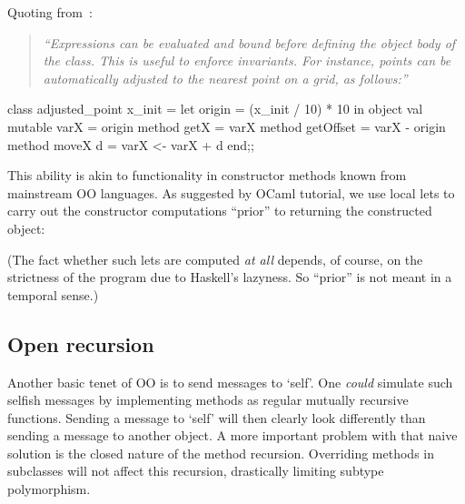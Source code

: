 Quoting from~\cite[\S\,3.1]{OCaml}:

\begin{quote}\itshape\small
``Expressions can be evaluated and bound before defining the object
body of the class. This is useful to enforce invariants. For instance,
points can be automatically adjusted to the nearest point on a grid,
as follows:''
\end{quote}

\begin{code}
 class adjusted_point x_init =
   let origin = (x_init / 10) * 10 in
   object
     val mutable varX = origin
     method getX      = varX
     method getOffset = varX - origin
     method moveX d   = varX <- varX + d
   end;;
\end{code}

\noindent
This ability is akin to functionality in constructor methods known
from mainstream OO languages. As suggested by OCaml tutorial, we use
local lets to carry out the constructor computations ``prior'' to
returning the constructed object:

\noindent
(The fact whether such lets are computed \emph{at all} depends, of
course, on the strictness of the program due to Haskell's lazyness. So
``prior'' is not meant in a temporal sense.)




\medskip

\subsection{Open recursion}

Another basic tenet of OO is to send messages to `self'.  One
\emph{could} simulate such selfish messages by implementing methods as
regular mutually recursive functions. Sending a message to `self' will
then clearly look differently than sending a message to another
object. A more important problem with that naive solution is the
closed nature of the method recursion. Overriding methods in
subclasses will not affect this recursion, drastically limiting
subtype polymorphism.

